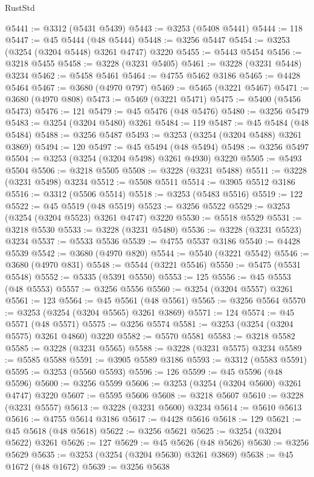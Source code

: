 \begin{lexlean}{RustStd}
\begin{coremodule}
@5441 := @3312 (@5431 @5439)
@5443 := @3253 (@5408 @5441)
@5444 := 118
@5447 := @45 @5444 (@48 @5444)
@5448 := @3256 @5447
@5454 := @3253 (@3254 (@3204 @5448) @3261 @4747) @3220
@5455 := @5443 @5454
@5456 := @3218 @5455
@5458 := @3228 (@3231 @5405)
@5461 := @3228 (@3231 @5448) @3234
@5462 := @5458 @5461
@5464 := @4755 @5462 @3186
@5465 := @4428 @5464
@5467 := @3680 (@4970 @797)
@5469 := @5465 (@3221 @5467)
@5471 := @3680 (@4970 @808)
@5473 := @5469 (@3221 @5471)
@5475 := @5400 (@5456 @5473)
@5476 := 121
@5479 := @45 @5476 (@48 @5476)
@5480 := @3256 @5479
@5483 := @3254 (@3204 @5480) @3261
@5484 := 119
@5487 := @45 @5484 (@48 @5484)
@5488 := @3256 @5487
@5493 := @3253 (@3254 (@3204 @5488) @3261 @3869)
@5494 := 120
@5497 := @45 @5494 (@48 @5494)
@5498 := @3256 @5497
@5504 := @3253 (@3254 (@3204 @5498) @3261 @4930) @3220
@5505 := @5493 @5504
@5506 := @3218 @5505
@5508 := @3228 (@3231 @5488)
@5511 := @3228 (@3231 @5498) @3234
@5512 := @5508 @5511
@5514 := @3905 @5512 @3186
@5516 := @3312 (@5506 @5514)
@5518 := @3253 (@5483 @5516)
@5519 := 122
@5522 := @45 @5519 (@48 @5519)
@5523 := @3256 @5522
@5529 := @3253 (@3254 (@3204 @5523) @3261 @4747) @3220
@5530 := @5518 @5529
@5531 := @3218 @5530
@5533 := @3228 (@3231 @5480)
@5536 := @3228 (@3231 @5523) @3234
@5537 := @5533 @5536
@5539 := @4755 @5537 @3186
@5540 := @4428 @5539
@5542 := @3680 (@4970 @820)
@5544 := @5540 (@3221 @5542)
@5546 := @3680 (@4970 @831)
@5548 := @5544 (@3221 @5546)
@5550 := @5475 (@5531 @5548)
@5552 := @5335 (@5391 @5550)
@5553 := 125
@5556 := @45 @5553 (@48 @5553)
@5557 := @3256 @5556
@5560 := @3254 (@3204 @5557) @3261
@5561 := 123
@5564 := @45 @5561 (@48 @5561)
@5565 := @3256 @5564
@5570 := @3253 (@3254 (@3204 @5565) @3261 @3869)
@5571 := 124
@5574 := @45 @5571 (@48 @5571)
@5575 := @3256 @5574
@5581 := @3253 (@3254 (@3204 @5575) @3261 @4860) @3220
@5582 := @5570 @5581
@5583 := @3218 @5582
@5585 := @3228 (@3231 @5565)
@5588 := @3228 (@3231 @5575) @3234
@5589 := @5585 @5588
@5591 := @3905 @5589 @3186
@5593 := @3312 (@5583 @5591)
@5595 := @3253 (@5560 @5593)
@5596 := 126
@5599 := @45 @5596 (@48 @5596)
@5600 := @3256 @5599
@5606 := @3253 (@3254 (@3204 @5600) @3261 @4747) @3220
@5607 := @5595 @5606
@5608 := @3218 @5607
@5610 := @3228 (@3231 @5557)
@5613 := @3228 (@3231 @5600) @3234
@5614 := @5610 @5613
@5616 := @4755 @5614 @3186
@5617 := @4428 @5616
@5618 := 129
@5621 := @45 @5618 (@48 @5618)
@5622 := @3256 @5621
@5625 := @3254 (@3204 @5622) @3261
@5626 := 127
@5629 := @45 @5626 (@48 @5626)
@5630 := @3256 @5629
@5635 := @3253 (@3254 (@3204 @5630) @3261 @3869)
@5638 := @45 @1672 (@48 @1672)
@5639 := @3256 @5638

\end{coremodule}
\end{lexlean}

